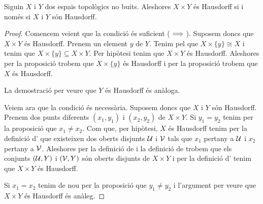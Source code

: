 \documentclass[../Apunts.tex]{subfiles}
\begin{document}
	\begin{theorem}
		\label{thm:dos espais són Hausdorff si i només si el seu producte és Hausdorff}
		Siguin \(X\) i \(Y\) dos espais topològics no buits. Aleshores \(X\times Y\) és Hausdorff si i només si \(X\) i \(Y\) són Hausdorff.
		\begin{proof}
			Comencem veient que la condició és suficient (\(\implies\)). Suposem doncs que \(X\times Y\) és Hausdorff. Prenem un element \(y\) de \(Y\). Tenim pel \corollari{}  que \(X\times\{y\}\cong X\) i tenim que \(X\times\{y\}\subseteq X\times Y\). Per hipòtesi tenim que \(X\times Y\) és Hausdorff. Aleshores per la proposició  trobem que \(X\times\{y\}\) és Hausdorff i per la proposició  trobem que \(X\) és Hausdorff.
			
			La demostració per veure que \(Y\) és Hausdorff és anàloga.
			
			Veiem ara que la condició és necessària. Suposem doncs que \(X\) i \(Y\) són Hausdorff. Prenem dos punts diferents \((x_{1},y_{1})\) i \((x_{2},y_{2})\) de \(X\times Y\). Si \(y_{1}=y_{2}\) tenim per la proposició  que \(x_{1}\neq x_{2}\). Com que, per hipòtesi, \(X\) és Hausdorff tenim per la definició d' que existeixen dos oberts disjunts \(\mathcal{U}\) i \(\mathcal{V}\) tals que \(x_{1}\) pertany a \(\mathcal{U}\) i \(x_{2}\) pertany a \(\mathcal{V}\). Aleshores per la definició de  i la definició de  trobem que els conjunts \((\mathcal{U},Y)\) i \((\mathcal{V},Y)\) són oberts disjunts de \(X\times Y\) i per la definició d' tenim que \(X\times Y\) és Hausdorff.
			
			Si \(x_{1}=x_{2}\) tenim de nou per la proposició  que \(y_{1}\neq y_{2}\) i l'argument per veure que \(X\times Y\) és Hausdorff és anàleg.
		\end{proof}
	\end{theorem}
\end{document}
